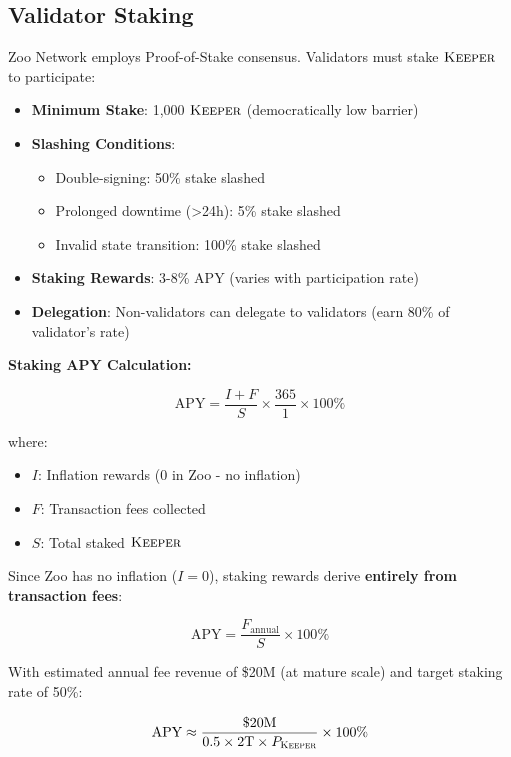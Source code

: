 \documentclass[11pt,letterpaper]{article}
\theoremstyle{definition}
\theoremstyle{remark}
\newcommand{\KEEPER}{\textsc{Keeper}}
\begin{document}
\subsection{Validator Staking}

Zoo Network employs Proof-of-Stake consensus. Validators must stake $\KEEPER$ to participate:

\begin{itemize}
\item \textbf{Minimum Stake}: 1,000 $\KEEPER$ (democratically low barrier)
\item \textbf{Slashing Conditions}:
    \begin{itemize}
    \item Double-signing: 50\% stake slashed
    \item Prolonged downtime (>24h): 5\% stake slashed
    \item Invalid state transition: 100\% stake slashed
    \end{itemize}
\item \textbf{Staking Rewards}: 3-8\% APY (varies with participation rate)
\item \textbf{Delegation}: Non-validators can delegate to validators (earn 80\% of validator's rate)
\end{itemize}

\textbf{Staking APY Calculation:}

\begin{equation}
\text{APY} = \frac{I + F}{S} \times \frac{365}{1} \times 100\%
\end{equation}

where:
\begin{itemize}
\item $I$: Inflation rewards (0 in Zoo - no inflation)
\item $F$: Transaction fees collected
\item $S$: Total staked $\KEEPER$
\end{itemize}

Since Zoo has no inflation ($I = 0$), staking rewards derive \textbf{entirely from transaction fees}:

\begin{equation}
\text{APY} = \frac{F_{\text{annual}}}{S} \times 100\%
\end{equation}

With estimated annual fee revenue of \$20M (at mature scale) and target staking rate of 50\%:

\begin{equation}
\text{APY} \approx \frac{\$20\text{M}}{0.5 \times 2\text{T} \times P_{\KEEPER}} \times 100\%
\end{equation}
\end{document}
